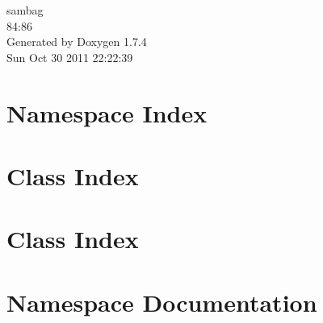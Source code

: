 \documentclass[a4paper]{book}
\begin{document}
\hypersetup{pageanchor=false}
\begin{titlepage}
\vspace*{7cm}
\begin{center}
{\Large sambag \\[1ex]\large 84:86 }\\
\vspace*{1cm}
{\large Generated by Doxygen 1.7.4}\\
\vspace*{0.5cm}
{\small Sun Oct 30 2011 22:22:39}\\
\end{center}
\end{titlepage}
\clearemptydoublepage
{}
\tableofcontents
\clearemptydoublepage
{}
\hypersetup{pageanchor=true}
\chapter{Namespace Index}

\chapter{Class Index}

\chapter{Class Index}

\chapter{Namespace Documentation}

\end{document}
